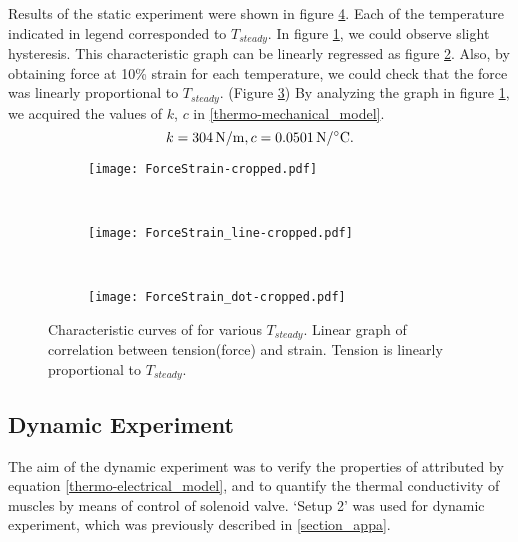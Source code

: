 Results of the static experiment were shown in figure \ref{static1_results}. Each of the temperature indicated in legend corresponded to $T_{steady}$. In figure \ref{static1_result}, we could observe slight hysteresis. This characteristic graph can be linearly regressed as figure \ref{static1_line}. Also, by obtaining force at 10\% strain for each temperature, we could check that the force was linearly proportional to $T_{steady}$. (Figure \ref{static1_dot}) By analyzing the graph in figure \ref{static1_result}, we acquired the values of $k$, $c$ in \eqref{thermo-mechanical_model}.
\begin{equation}
k=\SI{304}{\newton\per\meter}, c=\SI{0.0501}{\newton\per\degreeCelsius}. \notag
\end{equation}

\begin{figure}[t]
	\centering
	\begin{subfigure}[t]{0.32\textwidth}
		\texttt{[image: ForceStrain-cropped.pdf]}
		\caption{\label{static1_result}}
	\end{subfigure}
	~
	\begin{subfigure}[t]{0.32\textwidth}
		\texttt{[image: ForceStrain\_line-cropped.pdf]}
		\caption{\label{static1_line}}
	\end{subfigure}
	~
	\begin{subfigure}[t]{0.32\textwidth}
		\texttt{[image: ForceStrain\_dot-cropped.pdf]}
		\caption{\label{static1_dot}}
	\end{subfigure}
	\caption[Results of the static experiment]{ Characteristic curves of \scp for various $T_{steady}$.  Linear graph of correlation between tension(force) and strain.  Tension is linearly proportional to $T_{steady}$.}
	\label{static1_results}
\end{figure}

\subsection{Dynamic Experiment}\label{section_dynamic} %

The aim of the dynamic experiment was to verify the properties of \scps attributed by equation \eqref{thermo-electrical_model}, and to quantify the thermal conductivity of muscles by means of control of solenoid valve.
`Setup 2' was used for dynamic experiment, which was previously described in \ref{section_appa}. %

